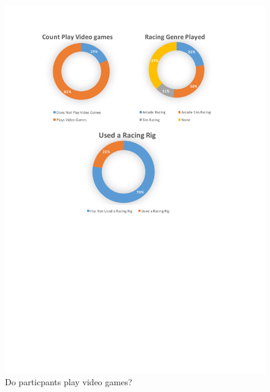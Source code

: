 \begin{figure}
	\centering
	\begin{minipage}{0.45\textwidth}
		\centering
		\includegraphics[width=\textwidth]{charts/playVideoGames.pdf}
		\caption[Do particpants play video games?]{Do particpants play video games?}
		\label{fig:chart-playVideoGames}
	\end{minipage}\hfill
	\begin{minipage}{0.45\textwidth}
		\centering

\end{minipage}
\end{figure}

